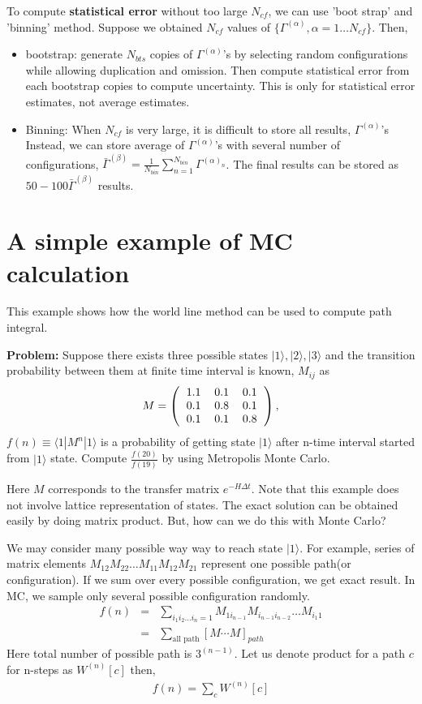 \documentclass[10pt]{book}
\newcommand{\bea}{\begin{eqnarray}}
\newcommand{\eea}{\end{eqnarray}}
\newcommand{\no}{\nonumber \\}
\def\la{\langle}
\def\ra{\rangle}
\newcommand{\threedmat}[9]
{\left(\begin{tabular}{ccc} {$#1$}&{$#2$}&{$#3$} \\
		{$#4$}&{$#5$}&{$#6$}\\
		{$#7$}&{$#8$}&{$#9$}\\
	\end{tabular}\right)}
\begin{document}
To compute {\bf statistical error} without too large $N_{cf}$, we can use 'boot strap' 
and 'binning' method. 
Suppose we obtained $N_{cf}$ values of $\{\Gamma^{(\alpha)},\alpha=1\dots N_{cf} \}$.
Then, 
\begin{itemize}
\item bootstrap: generate $N_{bts}$ copies of $\Gamma^{(\alpha)}$'s by selecting random
      configurations while allowing duplication and omission. Then compute statistical error 
      from each bootstrap copies to compute uncertainty. This is only for statistical error estimates,
      not average estimates. 
            
\item Binning: When $N_{cf}$ is very large, it is difficult to store all results, $\Gamma^{(\alpha)}$'s
      Instead, we can store average of  $\Gamma^{(\alpha)}$'s with several number of configurations,
      $\bar{\Gamma}^{(\beta)}=\frac{1}{N_{bin}}\sum_{n=1}^{N_{bin}} \Gamma^{(\alpha)_n}$. The final 
      results can be stored as $50-100\bar{\Gamma}^{(\beta)}$ results. 
       
\end{itemize}

\section{A simple example of MC calculation}
{\color{blue} This example shows how the world line method can be used to compute path integral.}

{\bf Problem:} Suppose there exists three possible states $|1\ra,|2\ra,|3\ra$ and the transition probability 
between them at finite time interval is known, $M_{ij}$ as
\bea 
M=\threedmat{1.1}{0.1}{0.1}{0.1}{0.8}{0.1}{0.1}{0.1}{0.8},
\eea  
$f(n)\equiv\la 1| M^n|1\ra$ is a probability of getting state $|1\ra$ after n-time interval started from $|1\ra$ state. Compute $\frac{f(20)}{f(19)}$ by using Metropolis Monte Carlo.

Here $M$ corresponds to the transfer matrix $e^{-H \Delta t}$.
Note that this example does not involve lattice representation of states.
The exact solution can be obtained easily by doing matrix product.
But, how can we do this with Monte Carlo? 

We may consider many possible way way to reach state $|1\ra$.
For example, series of matrix elements $M_{12} M_{22}\dots M_{11}M_{12} M_{21}$ 
represent one possible path(or configuration). 
If we sum over every possible configuration, we get exact result. 
In MC, we sample only several possible configuration randomly. 
\bea 
f(n)&=&\sum_{i_1 i_2\dots i_{n}=1} M_{1 i_{n-1}} M_{i_{n-1} i_{n-2}}\dots M_{i_1 1} \no 
    &=&\sum_{\mbox{all path}} [M\cdots M]_{path} 
\eea 
Here total number of possible path is $3^{(n-1)}$.
Let us denote product for a path $c$ for n-steps as $W^{(n)}[c]$ then,
\bea 
f(n)=\sum_{c} W^{(n)}[c]
\eea 
\end{document}
